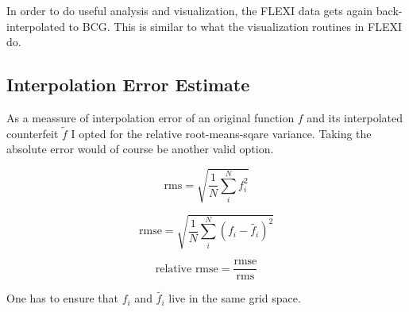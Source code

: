 In order to do useful analysis and visualization, the FLEXI data gets again
back-interpolated to BCG. This is similar to what the visualization routines in
FLEXI do.

\subsection{Interpolation Error Estimate}

As a meassure of interpolation error of an original function $f$ and its
interpolated counterfeit $\widetilde{f}$ I opted for the relative
root-means-sqare variance. Taking the absolute error would of course be another
valid option.

\begin{equation}
    \text{rms} = \sqrt{\frac{1}{N} \sum^N_i f^2_i} 
\end{equation}

\begin{equation}
    \text{rmse} = \sqrt{\frac{1}{N} \sum^N_i (f_i - \widetilde{f_i})^2} 
\end{equation}

\begin{equation}
    \text{relative rmse} = \frac{\text{rmse}}{\text{rms}} 
\end{equation}

One has to ensure that $f_i$ and $\widetilde{f_i}$ live in the same grid space.
